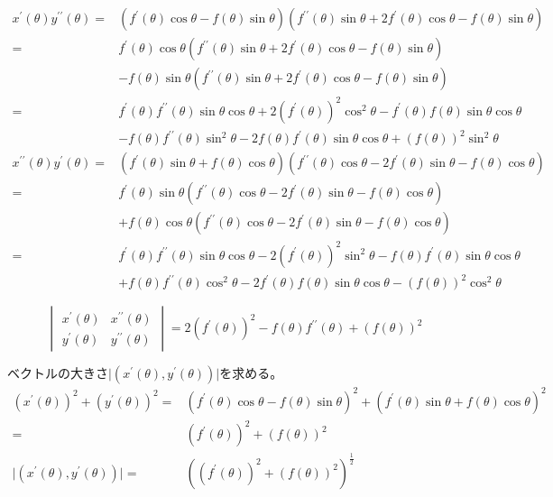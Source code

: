 \documentclass[12pt,b5paper]{ltjsarticle}
\begin{document}
\begin{enumerate}
      \begin{align}
       x^{\prime}(\theta)y^{\prime\prime}(\theta)
        =& (f^{\prime}(\theta)\cos\theta-f(\theta)\sin\theta)(f^{\prime\prime}(\theta)\sin\theta + 2f^{\prime}(\theta)\cos\theta - f(\theta)\sin\theta)\\
      =& f^{\prime}(\theta)\cos\theta(f^{\prime\prime}(\theta)\sin\theta + 2f^{\prime}(\theta)\cos\theta - f(\theta)\sin\theta)\\
      & -f(\theta)\sin\theta(f^{\prime\prime}(\theta)\sin\theta + 2f^{\prime}(\theta)\cos\theta - f(\theta)\sin\theta)\\
       =&
       f^{\prime}(\theta) f^{\prime\prime}(\theta)\sin\theta\cos\theta + 2(f^{\prime}(\theta))^2\cos^2\theta - f^{\prime}(\theta) f(\theta)\sin\theta\cos\theta\\
      & -f(\theta) f^{\prime\prime}(\theta)\sin^2\theta - 2f(\theta)f^{\prime}(\theta)\sin\theta \cos\theta + (f(\theta))^2\sin^2\theta\\
%
       x^{\prime\prime}(\theta)y^{\prime}(\theta)
        =& (f^{\prime}(\theta)\sin\theta+f(\theta)\cos\theta)(f^{\prime\prime}(\theta)\cos\theta - 2f^{\prime}(\theta)\sin\theta - f(\theta)\cos\theta)\\
       =& f^{\prime}(\theta)\sin\theta(f^{\prime\prime}(\theta)\cos\theta - 2f^{\prime}(\theta)\sin\theta - f(\theta)\cos\theta)\\
       & + f(\theta)\cos\theta(f^{\prime\prime}(\theta)\cos\theta - 2f^{\prime}(\theta)\sin\theta - f(\theta)\cos\theta)\\
       =& f^{\prime}(\theta) f^{\prime\prime}(\theta)\sin\theta\cos\theta - 2(f^{\prime}(\theta))^2\sin^2\theta - f(\theta)f^{\prime}(\theta)\sin\theta\cos\theta\\
       & + f(\theta)f^{\prime\prime}(\theta)\cos^2\theta - 2f^{\prime}(\theta)f(\theta)\sin\theta\cos\theta - (f(\theta))^2\cos^2\theta
      \end{align}

      \begin{equation}
       \begin{vmatrix}
        x^{\prime}(\theta) & x^{\prime\prime}(\theta)\\
        y^{\prime}(\theta) & y^{\prime\prime}(\theta)
       \end{vmatrix}
       = 2(f^{\prime}(\theta))^2 - f(\theta)f^{\prime\prime}(\theta) + (f(\theta))^2
      \end{equation}

      ベクトルの大きさ$\lvert (x^{\prime}(\theta),y^{\prime}(\theta)) \rvert$を求める。
      \begin{align}
       (x^{\prime}(\theta))^2+(y^{\prime}(\theta))^2
        =& (f^{\prime}(\theta)\cos\theta-f(\theta)\sin\theta)^2+(f^{\prime}(\theta)\sin\theta+f(\theta)\cos\theta)^2\\
        =& (f^{\prime}(\theta))^2 + (f(\theta))^2\\
       \lvert (x^{\prime}(\theta),y^{\prime}(\theta)) \rvert
       =& ((f^{\prime}(\theta))^2 + (f(\theta))^2)^{\frac{1}{2}}
      \end{align}


\end{enumerate}
\end{document}
